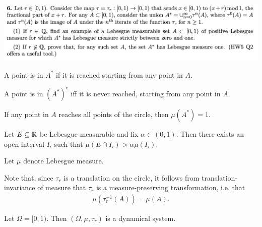 \newpage
\begin{mdframed}
  \includegraphics[width=400pt]{img/analysis--berkeley-202a-hw06-9bc5.png}
\end{mdframed}

\begin{intuition*}
  A point is in $A^*$ if it is reached starting from any point in $A$.

  A point is in $(A^*)^c$ iff it is never reached, starting from any point in $A$.

  If any point in $A$ reaches all points of the circle, then $\mu(A^*) = 1$.
\end{intuition*}

\begin{lemma*}
  Let $E \subseteq \mathbb{R}$ be Lebesgue measurable and fix $\alpha \in (0, 1)$. Then there exists an open
  interval $I_i$ such that $\mu(E \cap I_i) > \alpha \mu(I_i)$.
\end{lemma*}

Let $\mu$ denote Lebesgue measure.

Note that, since $\tau_r$ is a translation on the circle, it follows from translation-invariance of measure
that $\tau_r$ is a measure-preserving transformation, i.e. that
\begin{align*}
  \mu(\tau_r^{-1}(A)) = \mu(A).
\end{align*}

Let $\Omega = [0, 1)$. Then $(\Omega, \mu, \tau_r)$ is a dynamical system.

